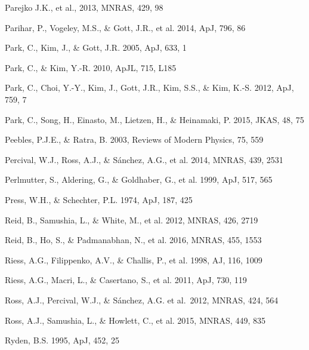 \documentclass[iop]{emulateapj}
\begin{document}
\begin{thebibliography}{}
Parejko J.K., et al., 2013, MNRAS, 429, 98

Parihar, P., Vogeley, M.S., \& Gott, J.R., et al. 2014, ApJ, 796, 86

Park, C., Kim, J., \& Gott, J.R. 2005, ApJ, 633, 1  

Park, C., \& Kim, Y.-R. 2010, ApJL, 715, L185  

Park, C., Choi, Y.-Y., Kim, J., Gott, J.R., Kim, S.S., \&
Kim, K.-S. 2012, ApJ, 759, 7

Park, C., Song, H., Einasto, M., Lietzen, H., \&
Heinamaki, P. 2015, JKAS, 48, 75

Peebles, P.J.E., \& Ratra, B. 2003, Reviews of Modern Physics, 75, 559

Percival, W.J., Ross, A.J., \& S\'{a}nchez, A.G., et al. 2014, MNRAS, 439, 2531

Perlmutter, S., Aldering, G., \& Goldhaber, G., et al. 1999, ApJ, 517, 565  

Press, W.H., \& Schechter, P.L. 1974, ApJ, 187, 425

Reid, B., Samushia, L., \& White, M., et al. 2012, MNRAS, 426, 2719  

Reid, B., Ho, S., \& Padmanabhan, N., et al.  2016, MNRAS, 455, 1553

Riess, A.G., Filippenko, A.V., \& Challis, P., et al. 1998, AJ, 116, 1009  

Riess, A.G., Macri, L., \& Casertano, S., et al. 2011, ApJ, 730, 119

Ross, A.J., Percival, W.J., \& S{\'a}nchez, A.G. et al.\ 2012, MNRAS, 424, 564 

Ross, A.J., Samushia, L., \& Howlett, C., et al. 2015, MNRAS, 449, 835

Ryden, B.S. 1995, ApJ, 452, 25  


\end{thebibliography}
\end{document}
